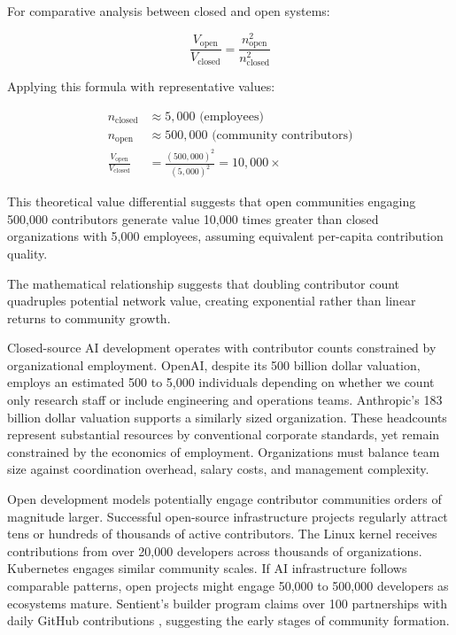 For comparative analysis between closed and open systems:

\begin{equation}
\frac{V_{\text{open}}}{V_{\text{closed}}} = \frac{n_{\text{open}}^2}{n_{\text{closed}}^2}
\label{eq:metcalfe_ratio}
\end{equation}

Applying this formula with representative values:

\begin{align}
n_{\text{closed}} &\approx 5{,}000 \text{ (employees)} \label{eq:n_closed}\\
n_{\text{open}} &\approx 500{,}000 \text{ (community contributors)} \label{eq:n_open}\\
\frac{V_{\text{open}}}{V_{\text{closed}}} &= \frac{(500{,}000)^2}{(5{,}000)^2} = 10{,}000\times \label{eq:value_diff}
\end{align}

This theoretical value differential suggests that open communities engaging 500,000 contributors generate value 10,000 times greater than closed organizations with 5,000 employees, assuming equivalent per-capita contribution quality.

The mathematical relationship suggests that doubling contributor count quadruples potential network value, creating exponential rather than linear returns to community growth.

Closed-source AI development operates with contributor counts constrained by organizational employment. OpenAI, despite its 500 billion dollar valuation, employs an estimated 500 to 5,000 individuals depending on whether we count only research staff or include engineering and operations teams. Anthropic's 183 billion dollar valuation supports a similarly sized organization. These headcounts represent substantial resources by conventional corporate standards, yet remain constrained by the economics of employment. Organizations must balance team size against coordination overhead, salary costs, and management complexity.

Open development models potentially engage contributor communities orders of magnitude larger. Successful open-source infrastructure projects regularly attract tens or hundreds of thousands of active contributors. The Linux kernel receives contributions from over 20,000 developers across thousands of organizations. Kubernetes engages similar community scales. If AI infrastructure follows comparable patterns, open projects might engage 50,000 to 500,000 developers as ecosystems mature. Sentient's builder program claims over 100 partnerships with daily GitHub contributions \cite{ods_github2025, roma_github2025}, suggesting the early stages of community formation.

